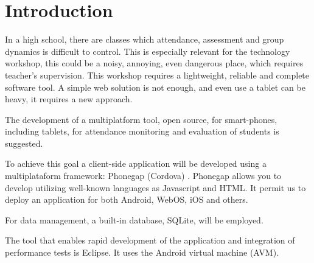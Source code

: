 \chapter{Introduction}
In a high school, there are classes which attendance, assessment and group dynamics is difficult to control.
This is especially relevant for the technology workshop, this could be a noisy, annoying, even dangerous place, which requires teacher's supervision. This workshop requires a lightweight,
reliable and complete  software tool. A simple web solution is not enough, and even use a tablet can be heavy, it requires a new approach.
  
The development of a multiplatform tool, open source, for smart-phones, including tablets, for attendance monitoring and evaluation of students is suggested.

To achieve this goal a client-side application will be developed using a multiplataform framework: Phonegap (Cordova) \cite{PhoneGap}.
Phonegap allows you to develop utilizing well-known languages as Javascript and HTML. It permit us to deploy an application for both Android,
WebOS, iOS and others.    

For data management, a built-in database, SQLite, will be employed.
  
The tool that enables rapid development of the application and integration of performance tests is Eclipse. It uses the Android virtual machine (AVM).

